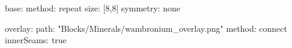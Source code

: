 base:
  method: repeat
  size: [8,8]
  symmetry: none

overlay:
  path: "Blocks/Minerals/wambronium_overlay.png"
  method: connect
  innerSeams: true
